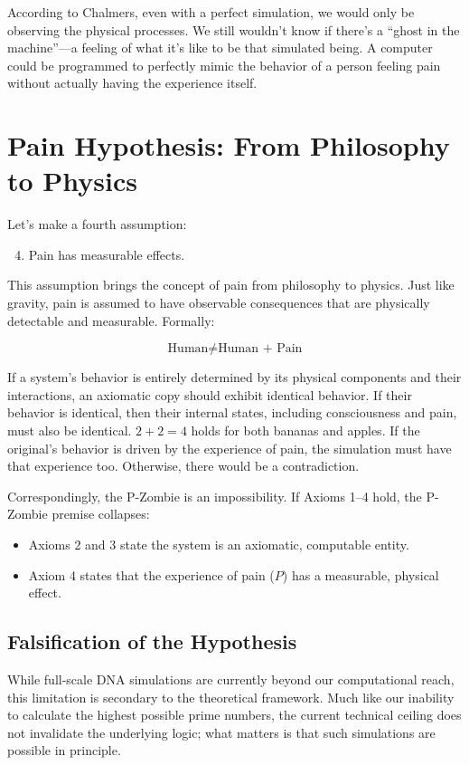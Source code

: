 According to Chalmers, even with a perfect simulation, we would only be observing the physical processes.
We still wouldn't know if there's a ``ghost in the machine''---a feeling of what it's like to be that simulated being.
A computer could be programmed to perfectly mimic the behavior of a person feeling pain without actually having the experience itself. 


\section{Pain Hypothesis: From Philosophy to Physics}

Let's make a fourth assumption:

\begin{enumerate}
    \setcounter{enumi}{3}
    \item Pain has measurable effects.
\end{enumerate}

This assumption brings the concept of pain from philosophy to physics.
Just like gravity, pain is assumed to have observable consequences that are physically detectable and measurable. Formally:

\[
\text{Human} \neq \text{Human + Pain}
\]

If a system's behavior is entirely determined by its physical components and their interactions, an axiomatic copy should exhibit identical behavior.
If their behavior is identical, then their internal states, including consciousness and pain, must also be identical.
$2+2=4$ holds for both bananas and apples.
If the original's behavior is driven by the experience of pain, the simulation must have that experience too.
Otherwise, there would be a contradiction.

Correspondingly, the P-Zombie is an impossibility. If Axioms 1--4 hold, the P-Zombie premise collapses:
\begin{itemize}
    \item Axioms 2 and 3 state the system is an axiomatic, computable entity.
    \item Axiom 4 states that the experience of pain ($P$) has a measurable, physical effect.
\end{itemize}


\subsection*{Falsification of the Hypothesis}

While full-scale DNA simulations are currently beyond our computational reach, this limitation is secondary to the theoretical framework.
Much like our inability to calculate the highest possible prime numbers, the current technical ceiling does not invalidate the underlying logic; what matters is that such simulations are possible in principle.

